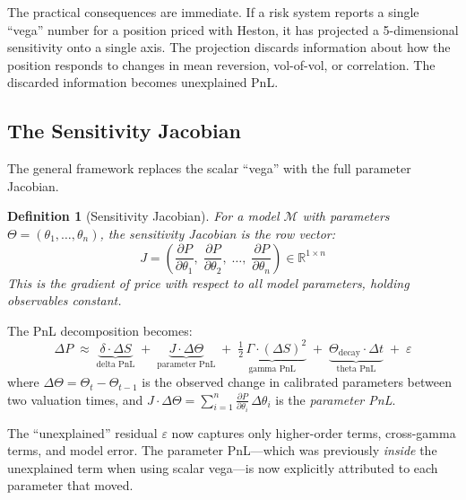 \documentclass[11pt,a4paper]{article}
\newtheorem{definition}{Definition}[section]
\begin{document}
\noindent The practical consequences are immediate.  If a risk system reports a single ``vega'' number for a position priced with Heston, it has projected a 5-dimensional sensitivity onto a single axis.  The projection discards information about how the position responds to changes in mean reversion, vol-of-vol, or correlation.  The discarded information becomes unexplained PnL.

\subsection{The Sensitivity Jacobian}
\label{sec:jacobian}

The general framework replaces the scalar ``vega'' with the full parameter Jacobian.

\begin{definition}[Sensitivity Jacobian]
\label{def:jacobian}
For a model $\mathcal{M}$ with parameters $\Theta = (\theta_1, \ldots, \theta_n)$, the \emph{sensitivity Jacobian} is the row vector:
\begin{equation}\label{eq:jacobian}
J = \left(\frac{\partial P}{\partial \theta_1},\; \frac{\partial P}{\partial \theta_2},\; \ldots,\; \frac{\partial P}{\partial \theta_n}\right) \in \mathbb{R}^{1 \times n}
\end{equation}
This is the gradient of price with respect to all model parameters, holding observables constant.
\end{definition}

\noindent The PnL decomposition becomes:
\begin{equation}\label{eq:pnl-jacobian}
\boxed{
\Delta P \;\approx\; \underbrace{\delta \cdot \Delta S}_{\text{delta PnL}} \;+\; \underbrace{J \cdot \Delta\Theta}_{\text{parameter PnL}} \;+\; \underbrace{\tfrac{1}{2}\,\Gamma \cdot (\Delta S)^2}_{\text{gamma PnL}} \;+\; \underbrace{\Theta_{\text{decay}} \cdot \Delta t}_{\text{theta PnL}} \;+\; \varepsilon
}
\end{equation}
where $\Delta\Theta = \Theta_{t} - \Theta_{t-1}$ is the observed change in calibrated parameters between two valuation times, and $J \cdot \Delta\Theta = \sum_{i=1}^{n} \frac{\partial P}{\partial \theta_i}\,\Delta\theta_i$ is the \emph{parameter PnL}.

The ``unexplained'' residual $\varepsilon$ now captures only higher-order terms, cross-gamma terms, and model error.  The parameter PnL---which was previously \emph{inside} the unexplained term when using scalar vega---is now explicitly attributed to each parameter that moved.
\end{document}
